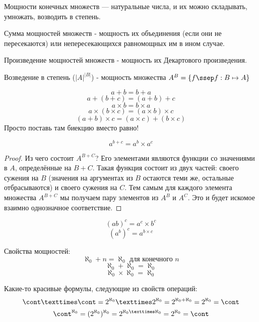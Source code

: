 
Мощности конечных множеств — натуральные числа, и их можно складывать, умножать, возводить в степень.

\begin{definition} \thmslashn

	Сумма мощностей множеств - мощность их объединения (если они не пересекаются) или непересекающихся равномощных им в ином случае.
\end{definition}

\begin{definition} \thmslashn

	Произведение мощностей множеств - мощность их Декартового произведения.
\end{definition}

\begin{definition} \thmslashn

	Возведение в степень ($|A|^{|B|}$) - мощность множества $A^B = \{f \ssep f: B \mapsto  A\}$
\end{definition}

\[a + b = b + a\]
\[a + (b + c) = (a + b) + c\]
\[a × b = b × a\]
\[a × (b × c) = (a × b) × c\]
\[(a + b) × c = (a × c) + (b × c)\]
Просто поставь там биекцию вместо равно!

\begin{theorem} \thmslashn

	\[a^{b+c} = a^b × a^c\]
	
	\begin{proof} \thmslashn
	
		Из чего состоит $A^{B+C}$? Его элементами являются функции со значениями в $A$, определённые на $B + C$. Такая функция состоит из двух частей: своего сужения на $B$ (значения на аргументах из $B$ остаются теми же, остальные отбрасываются) и своего сужения на $C$. Тем самым для каждого элемента множества $A^{B+C}$ мы получаем пару элементов из $A^B$ и $A^C$. Это и будет искомое взаимно однозначное соответствие.
	\end{proof}
\end{theorem}

\[(ab)^c = a^c × b^c\]
\[(a^b)^c = a^{b × c}\]


Свойства мощностей:
\[\aleph_0 + n = \aleph_0 \text{ для конечного } n \]
\[\aleph_0 + \aleph_0 = \aleph_0\]
\[\aleph_0 × \aleph_0 = \aleph_0\]

Какие-то красивые формулы, следующие из свойств операций:
\[\cont × \cont = 2^{\aleph_0} × 2^{\aleph_0} = 2^{\aleph_0 + \aleph_0} = 2^{\aleph_0} = \cont\]
\[\cont^{\aleph_0} = (2^{\aleph_0})^{\aleph_0} = 2^{\aleph_0×\aleph_0} = 2^{\aleph_0} = \cont\]


















